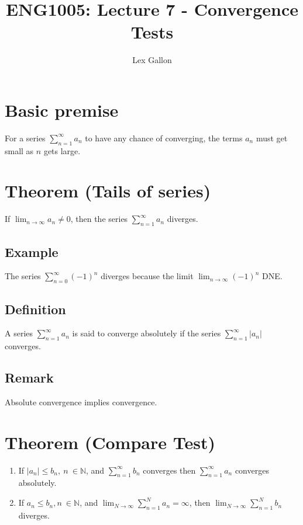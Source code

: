 \documentclass[11pt]{article}
\newcommand{\naturals}{\mathbb{N}}
\begin{document}
\title{ENG1005: Lecture 7 - Convergence Tests}
\author{Lex Gallon}
\maketitle

\tableofcontents

\section{Basic premise}
For a series $\displaystyle{\sum_{n=1}^\infty a_n}$ to have any chance of converging, the terms $a_n$ must get small as $n$ gets large.

\section{Theorem (Tails of series)}
If $\displaystyle{\lim_{n\rightarrow\infty}a_n \not=0}$, then the series $\displaystyle{\sum_{n=1}^\infty a_n}$ diverges.

\subsection{Example}
The series $\displaystyle{\sum_{n=0}^\infty (-1)^n}$ diverges because the limit $\displaystyle{\lim_{n\rightarrow\infty} (-1)^n}$ DNE. 

\subsection{Definition}
A series $\displaystyle{\sum_{n=1}^\infty a_n}$ is said to converge absolutely if the series $\displaystyle{\sum_{n=1}^\infty |a_n|}$ converges.

\subsection{Remark}
Absolute convergence implies convergence.

\section{Theorem (Compare Test)}
\begin{enumerate}[ (i) ]
\item If $|a_n| \leq b_n,\ n\ \in \naturals$, and $\displaystyle{\sum_{n=1}^\infty b_n}$ converges then $\displaystyle{\sum_{n=1}^\infty a_n}$ converges absolutely.

\item If $a_n \leq b_n, n\ \in \naturals$, and $\displaystyle{\lim_{N\rightarrow\infty}} \sum_{n=1}^N a_n = \infty$, then  $\displaystyle{\lim_{N\rightarrow\infty}} \sum_{n=1}^N b_n$ diverges.
\end{enumerate}
\end{document}
